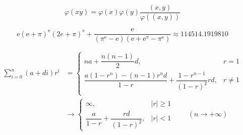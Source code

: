 \begin{equation}
    \varphi(xy)=\varphi(x)\varphi(y)\frac{(x,y)}{\varphi((x,y))}
\end{equation}

\begin{equation}
    \mathrm{e}(\mathrm{e}+\pi)^\mathrm{e}(2e + \pi)^\mathrm{e}+\frac{\mathrm{e}}{(\pi^\mathrm{e}-\mathrm{e})(\mathrm{e}+\mathrm{e}^\pi-\pi^\mathrm{e})}\approx 114514.1919810
\end{equation}

\begin{equation}
    \begin{aligned}
        \sum_{i=0}^n(a+di)r^i & =\begin{cases}
                                     na+\dfrac{n(n-1)}{2}d,                                        & r=1    \\
                                     \dfrac{a(1-r^n)-(n-1)r^nd}{1-r}+\dfrac{1-r^{n-1}}{(1-r)^2}rd, & r\ne 1 \\
                                 \end{cases} \\
                              & \to\begin{cases}
                                       \infty,                             & |r|\geq 1 \\
                                       \dfrac{a}{1-r}+\dfrac{rd}{(1-r)^2}, & |r|<1
                                   \end{cases}\qquad(n\to+\infty)
    \end{aligned}
\end{equation}
